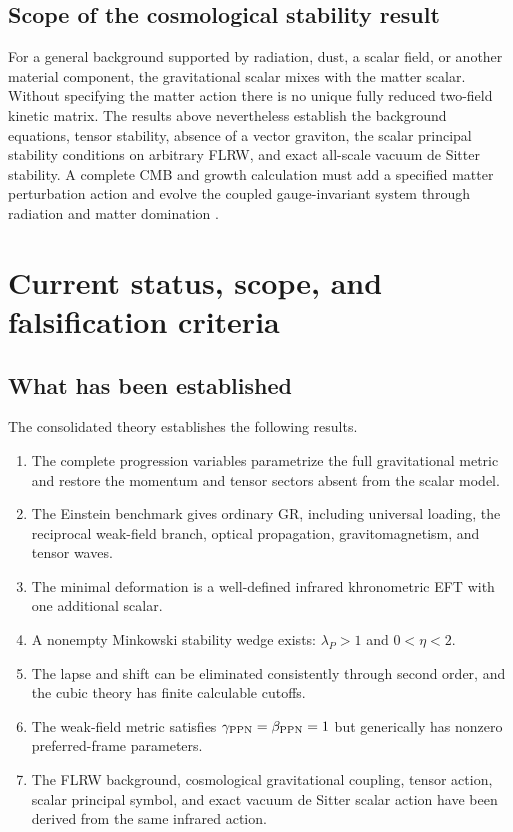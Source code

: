 \documentclass[11pt]{article}
\newcommand{\bppn}{\beta_{\rm PPN}}
\newcommand{\gppn}{\gamma_{\rm PPN}}
\begin{document}
\subsection{Scope of the cosmological stability result}

For a general background supported by radiation, dust, a scalar field, or another material component, the gravitational scalar mixes with the matter scalar.  Without specifying the matter action there is no unique fully reduced two-field kinetic matrix.  The results above nevertheless establish the background equations, tensor stability, absence of a vector graviton, the scalar principal stability conditions on arbitrary FLRW, and exact all-scale vacuum de Sitter stability.  A complete CMB and growth calculation must add a specified matter perturbation action and evolve the coupled gauge-invariant system through radiation and matter domination \cite{KobayashiCosmo,AudrenCosmo}.


\section{Current status, scope, and falsification criteria}

\subsection{What has been established}

The consolidated theory establishes the following results.
\begin{enumerate}[label=(\arabic*)]
\item The complete progression variables parametrize the full gravitational metric and restore the momentum and tensor sectors absent from the scalar model.
\item The Einstein benchmark gives ordinary GR, including universal loading, the reciprocal weak-field branch, optical propagation, gravitomagnetism, and tensor waves.
\item The minimal deformation is a well-defined infrared khronometric EFT with one additional scalar.
\item A nonempty Minkowski stability wedge exists: $\lambda_P>1$ and $0<\eta<2$.
\item The lapse and shift can be eliminated consistently through second order, and the cubic theory has finite calculable cutoffs.
\item The weak-field metric satisfies $\gppn=\bppn=1$ but generically has nonzero preferred-frame parameters.
\item The FLRW background, cosmological gravitational coupling, tensor action, scalar principal symbol, and exact vacuum de Sitter scalar action have been derived from the same infrared action.
\end{enumerate}
\end{document}
